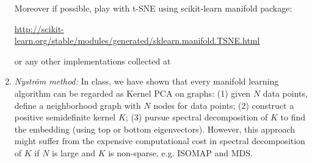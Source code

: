 \documentclass[11pt]{article}
\def\R{{\mathbb R}}
\begin{document}
\begin{enumerate}
\subitem *Moreover if possible, play with t-SNE using scikit-learn manifold package:

\url{http://scikit-learn.org/stable/modules/generated/sklearn.manifold.TSNE.html}

or any other implementations collected at 

{}

%


\item {\em Nystr\"{o}m method:} In class, we have shown that every manifold learning algorithm can be regarded as Kernel PCA on graphs: (1) given $N$ data points, define a neighborhood graph with $N$ nodes for data points; (2) construct a positive semidefinite kernel $K$; (3) pursue spectral decomposition of $K$ to find the embedding (using top or bottom eigenvectors). However, this approach might suffer from the expensive computational cost in spectral decomposition of $K$ if $N$ is large and $K$ is non-sparse, e.g. ISOMAP and MDS. 


\end{enumerate}
\end{document}
